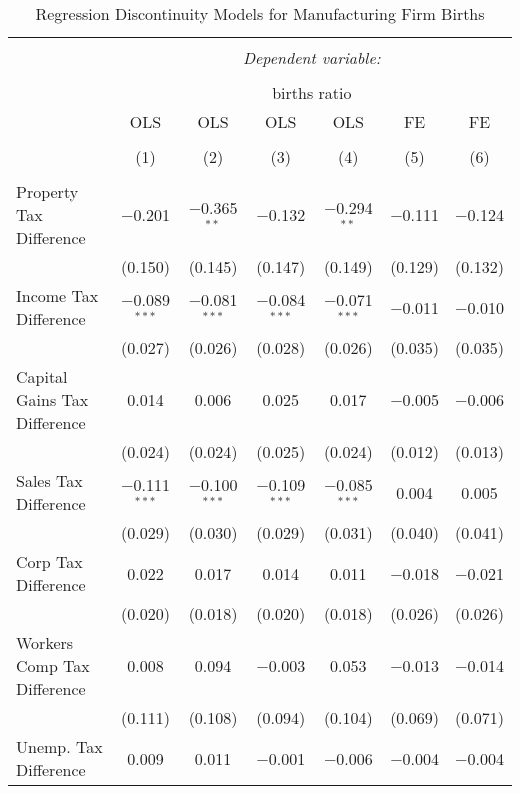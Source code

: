 
\begin{table}[!htbp] \centering 
  \caption{Regression Discontinuity Models for  Manufacturing Firm Births} 
  \label{31-33rd} 
\footnotesize 
\begin{tabular}{@{\extracolsep{5pt}}lcccccc} 
\\[-1.8ex]\hline 
\hline \\[-1.8ex] 
 & \multicolumn{6}{c}{\textit{Dependent variable:}} \\ 
\cline{2-7} 
\\[-1.8ex] & \multicolumn{6}{c}{births ratio} \\ 
 & OLS & OLS & OLS & OLS & FE & FE \\ 
\\[-1.8ex] & (1) & (2) & (3) & (4) & (5) & (6)\\ 
\hline \\[-1.8ex] 
 Property Tax Difference & $-$0.201 & $-$0.365$^{**}$ & $-$0.132 & $-$0.294$^{**}$ & $-$0.111 & $-$0.124 \\ 
  & (0.150) & (0.145) & (0.147) & (0.149) & (0.129) & (0.132) \\ 
  Income Tax Difference & $-$0.089$^{***}$ & $-$0.081$^{***}$ & $-$0.084$^{***}$ & $-$0.071$^{***}$ & $-$0.011 & $-$0.010 \\ 
  & (0.027) & (0.026) & (0.028) & (0.026) & (0.035) & (0.035) \\ 
  Capital Gains Tax Difference & 0.014 & 0.006 & 0.025 & 0.017 & $-$0.005 & $-$0.006 \\ 
  & (0.024) & (0.024) & (0.025) & (0.024) & (0.012) & (0.013) \\ 
  Sales Tax Difference & $-$0.111$^{***}$ & $-$0.100$^{***}$ & $-$0.109$^{***}$ & $-$0.085$^{***}$ & 0.004 & 0.005 \\ 
  & (0.029) & (0.030) & (0.029) & (0.031) & (0.040) & (0.041) \\ 
  Corp Tax Difference & 0.022 & 0.017 & 0.014 & 0.011 & $-$0.018 & $-$0.021 \\ 
  & (0.020) & (0.018) & (0.020) & (0.018) & (0.026) & (0.026) \\ 
  Workers Comp Tax Difference & 0.008 & 0.094 & $-$0.003 & 0.053 & $-$0.013 & $-$0.014 \\ 
  & (0.111) & (0.108) & (0.094) & (0.104) & (0.069) & (0.071) \\ 
  Unemp. Tax Difference & 0.009 & 0.011 & $-$0.001 & $-$0.006 & $-$0.004 & $-$0.004 \\ 

\end{tabular}
\end{table}
